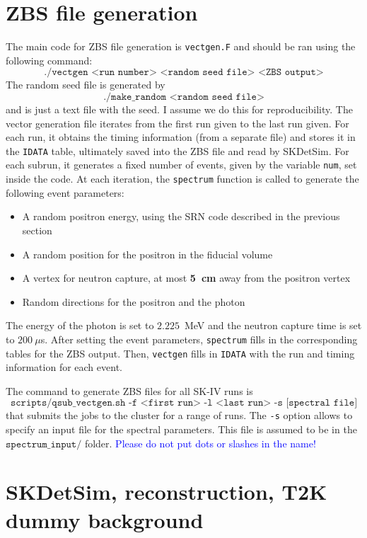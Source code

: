 \documentclass[12pt]{article}
\begin{document}
    \section{ZBS file generation}
    The main code for ZBS file generation is \texttt{vectgen.F} and should be ran using the following command:
    $$\texttt{./vectgen <run number> <random seed file> <ZBS output>}$$
    The random seed file is generated by
        $$\texttt{./make\_random <random seed file>}$$
    and is just a text file with the seed. I assume we do this for reproducibility. The vector generation file iterates from the first run given to the last run given. For each run, it obtains the timing information (from a separate file) and stores it in the \texttt{IDATA} table, ultimately saved into the ZBS file and read by SKDetSim. For each subrun, it generates a fixed number of events, given by the variable \texttt{num}, set inside the code.  At each iteration, the \texttt{spectrum} function is called to generate the following event parameters:
    \begin{itemize}
        \item A random positron energy, using the SRN code described in the previous section
        \item A random position for the positron in the fiducial volume
        \item A vertex for neutron capture, at most \textbf{5~cm} away from the positron vertex
        \item Random directions for the positron and the photon
    \end{itemize}
    The energy of the photon is set to $2.225$~MeV and the neutron capture time is set to $200~\mu$s. After setting the event parameters, \texttt{spectrum} fills in the corresponding tables for the ZBS output. Then, \texttt{vectgen} fills in \texttt{IDATA} with the run and timing information for each event.
    
    The command to generate ZBS files for all SK-IV runs is 
    $$\texttt{scripts/qsub\_vectgen.sh -f <first run> -l <last run> -s [spectral file]}$$
    that submits the jobs to the cluster for a range of runs. The \texttt{-s} option allows to specify an input file for the spectral parameters. This file is assumed to be in the $\texttt{spectrum\_input/}$ folder. \textcolor{blue}{Please do not put dots or slashes in the name!}
    \section{SKDetSim, reconstruction, T2K dummy background}
\end{document}
